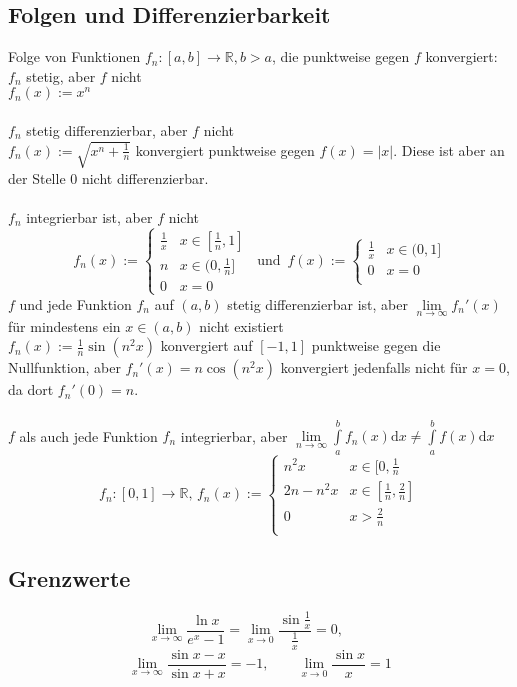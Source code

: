 \documentclass[10pt,a4paper^, twocolumn]{article}
\renewcommand{\d}{\mathrm{d}} %
\newcommand{\R}{\mathbb{R}}
\begin{document}
\subsection{Folgen und Differenzierbarkeit}
Folge von Funktionen $f_n: [a,b] \rightarrow \R, b > a$, die punktweise gegen $f$ konvergiert:
$f_n$ stetig, aber $f$ nicht\\
$f_n(x) := x^n$ \\\\
$f_n$ stetig differenzierbar, aber $f$ nicht\\
$f_n(x) := \sqrt{x^n + \frac{1}{n}}$ konvergiert punktweise gegen $f(x) = |x|$. Diese ist aber an der Stelle $0$ nicht differenzierbar. \\\\
$f_n$ integrierbar ist, aber $f$ nicht\\
$$ f_n(x) := \begin{cases} \frac{1}{x} & x \in [\frac{1}{n},1] \\
n & x \in (0, \frac{1}{n}] \\
0 & x = 0 \end{cases}
\, \text{ und } \, f(x) := \begin{cases} \frac{1}{x} & x \in (0,1] \\
0 & x = 0 \\ \end{cases}$$
$f$ und jede Funktion $f_n$ auf $(a,b)$ stetig differenzierbar ist, aber $\lim \limits_{n \to \infty} f_n'(x)$ für mindestens ein $x \in (a,b)$ nicht existiert\\
$f_n(x) := \frac{1}{n} \sin(n^2 x)$ konvergiert auf $[-1,1]$ punktweise gegen die Nullfunktion, aber $f_n'(x) = n \cos(n^2 x)$ konvergiert jedenfalls nicht für $x = 0$, da dort $f_n'(0) = n$.\\\\
$f$ als auch jede Funktion $f_n$ integrierbar, aber $\lim \limits_{n \to \infty} \int \limits_a^b f_n(x) \d x \neq \int \limits_a^b f(x) \d x$
$$ f_n : [0,1] \rightarrow \R, \, f_n(x) := \begin{cases} n^2 x & x \in [0,\frac{1}{n} \\
2n-n^2 x & x \in [\frac{1}{n},\frac{2}{n}] \\
0 & x > \frac{2}{n} \\ \end{cases}$$

\subsection{Grenzwerte}
$$ 
	\lim_{x \to \infty} \frac{ \ln{x}}{e^x -1} = 
	\lim_{x \to 0} \frac{\sin{\frac{1}{x}}}{\frac{1}{x}} 
	= 0 , 
	\qquad 
$$
$$
	\lim_{x \to \infty} \frac{\sin{x} -x}{\sin{x}+x} = -1, 
	\qquad \lim_{x \to 0} \frac{\sin{x}}{x} = 1
$$
\end{document}
